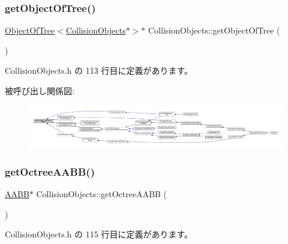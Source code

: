 \subsubsection{\texorpdfstring{get\+Object\+Of\+Tree()}{getObjectOfTree()}}
{\footnotesize\ttfamily \mbox{\hyperlink{class_object_of_tree}{Object\+Of\+Tree}}$<$\mbox{\hyperlink{class_collision_objects}{Collision\+Objects}}$\ast$$>$$\ast$ Collision\+Objects\+::get\+Object\+Of\+Tree (\begin{DoxyParamCaption}{ }\end{DoxyParamCaption})\hspace{0.3cm}{\ttfamily [inline]}}



 Collision\+Objects.\+h の 113 行目に定義があります。

被呼び出し関係図\+:
\nopagebreak
\begin{figure}[H]
\begin{center}
\leavevmode
\includegraphics[width=350pt]{class_collision_objects_a344311b0c469e591a112eb1d6b0247cb_icgraph}
\end{center}
\end{figure}
\mbox{\label{class_collision_objects_aee138e1c28f7f3dcbdce56181d59b628}} 
\subsubsection{\texorpdfstring{get\+Octree\+A\+A\+B\+B()}{getOctreeAABB()}}
{\footnotesize\ttfamily \mbox{\hyperlink{class_a_a_b_b}{A\+A\+BB}}$\ast$ Collision\+Objects\+::get\+Octree\+A\+A\+BB (\begin{DoxyParamCaption}{ }\end{DoxyParamCaption})\hspace{0.3cm}{\ttfamily [inline]}}



 Collision\+Objects.\+h の 115 行目に定義があります。

